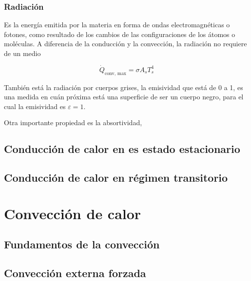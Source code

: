 \documentclass[11pt]{report}
\theoremstyle{plain}
\theoremstyle{definition}
\begin{document}
\subsection{Radiación}

Es la energía emitida por la materia en forma de ondas electromagnéticas o fotones, como resultado de los cambios de las configuraciones de los átomos o moléculas. A diferencia de la conducción y la convección, la radiación no requiere de un medio

\begin{equation}
	\dot{Q}_\text{conv, max} = \sigma A_s T^4_s
	\label{eq:radiación}
\end{equation}


También está la radiación por cuerpos grises, la emisividad que está de 0 a 1, es una medida en cuán próxima está una superficie de ser un cuerpo negro, para el cual la emisividad es $\varepsilon = 1$.


Otra importante propiedad es la absortividad, 

\section{Conducción de calor en es estado estacionario}


\section{Conducción de calor en régimen transitorio}


\chapter{Convección de calor}
%
\section{Fundamentos de la convección}
%
\section{Convección externa forzada}
%
\end{document}
